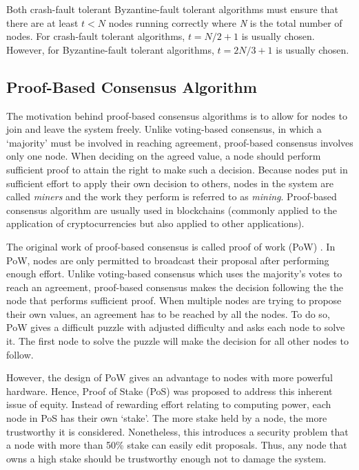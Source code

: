 \documentclass[12pt, a4paper]{article}
\begin{document}
Both crash-fault tolerant Byzantine-fault tolerant algorithms must ensure that there are at least $t < N$ nodes running correctly where \textit{N} is the total number of nodes. For crash-fault tolerant algorithms,
$t = N/2 + 1$ is usually chosen. However, for Byzantine-fault tolerant
algorithms, $t = 2N/3 + 1$ is usually chosen.

\subsection{Proof-Based Consensus Algorithm}
The motivation behind proof-based consensus algorithms is to allow for nodes to join and leave the system freely. Unlike voting-based consensus, in which a `majority' must be involved in reaching agreement, proof-based consensus involves only one node. When deciding on the agreed value, a node should perform sufficient proof to attain the right to make such a decision. Because nodes put in sufficient effort to apply their own decision to others, nodes in the system are called \textit{miners} and the work they perform is referred to as \textit{mining}. Proof-based consensus algorithm are usually used in blockchains (commonly applied to the application of cryptocurrencies but also applied to other applications).

The original work of proof-based consensus is called proof of work (PoW) \cite{nakamoto2019bitcoin}. In PoW, nodes are only permitted to broadcast their proposal after performing enough effort. Unlike voting-based consensus which uses the majority's votes to reach an agreement, proof-based consensus makes the decision following the the node that performs sufficient proof. When multiple nodes are trying to propose their own values, an agreement has to be reached by all the nodes. To do so, PoW gives a difficult puzzle with adjusted difficulty and asks each node to solve it. The first node to solve the puzzle will make the decision for all other nodes to follow.

However, the design of PoW gives an advantage to nodes with more powerful hardware. Hence, Proof of Stake (PoS) was proposed to address this inherent issue of equity. Instead of rewarding effort relating to computing power, each node in PoS has their own `stake'. The more stake held by a node, the more trustworthy it is considered. Nonetheless, this introduces a security problem that a node with more than 50\% stake can easily edit proposals. Thus, any node that owns a high stake should be trustworthy enough not to damage the system.
\end{document}
